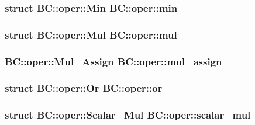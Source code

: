 \subsubsection[{\texorpdfstring{min}{min}}]{\setlength{\rightskip}{0pt plus 5cm}struct {\bf B\+C\+::oper\+::\+Min}  B\+C\+::oper\+::min}\hypertarget{namespaceBC_1_1oper_a6de199c9caa3c7b2cfcd65e5de942260}{}\label{namespaceBC_1_1oper_a6de199c9caa3c7b2cfcd65e5de942260}
\subsubsection[{\texorpdfstring{mul}{mul}}]{\setlength{\rightskip}{0pt plus 5cm}struct {\bf B\+C\+::oper\+::\+Mul}  B\+C\+::oper\+::mul}\hypertarget{namespaceBC_1_1oper_aab26ff6ee1216f242214fc8b6674c32e}{}\label{namespaceBC_1_1oper_aab26ff6ee1216f242214fc8b6674c32e}
\subsubsection[{\texorpdfstring{mul\+\_\+assign}{mul_assign}}]{\setlength{\rightskip}{0pt plus 5cm} {\bf B\+C\+::oper\+::\+Mul\+\_\+\+Assign}  B\+C\+::oper\+::mul\+\_\+assign}\hypertarget{namespaceBC_1_1oper_ab178d6cfe370e3569fea8a85ccf5647a}{}\label{namespaceBC_1_1oper_ab178d6cfe370e3569fea8a85ccf5647a}
\subsubsection[{\texorpdfstring{or\+\_\+}{or_}}]{\setlength{\rightskip}{0pt plus 5cm}struct {\bf B\+C\+::oper\+::\+Or}  B\+C\+::oper\+::or\+\_\+}\hypertarget{namespaceBC_1_1oper_a104ba11d7139cc2e0161e9590c21eb0f}{}\label{namespaceBC_1_1oper_a104ba11d7139cc2e0161e9590c21eb0f}
\subsubsection[{\texorpdfstring{scalar\+\_\+mul}{scalar_mul}}]{\setlength{\rightskip}{0pt plus 5cm}struct {\bf B\+C\+::oper\+::\+Scalar\+\_\+\+Mul}  B\+C\+::oper\+::scalar\+\_\+mul}\hypertarget{namespaceBC_1_1oper_aa77191efbcb645a6ceda7e0fb7ac6843}{}\label{namespaceBC_1_1oper_aa77191efbcb645a6ceda7e0fb7ac6843}
